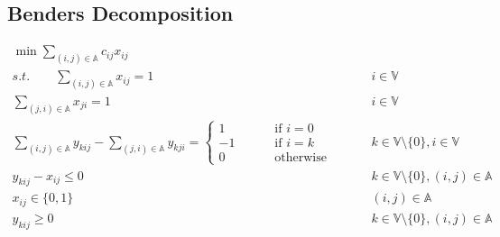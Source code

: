 \documentclass[UTF8]{article}
\begin{document}
	\subsection{Benders Decomposition}
		\begin{align*}
			\min \sum_{(i, j) \in \mathbb{A}} c_{ij} x_{ij} & \\
			s.t. \qquad \sum_{(i, j) \in \mathbb{A}} x_{ij} = 1 & \qquad i \in \mathbb{V} \\
			\sum_{(j, i) \in \mathbb{A}} x_{ji} = 1 & \qquad i \in \mathbb{V} \\
			\sum_{(i, j) \in \mathbb{A}} y_{kij} - \sum_{(j, i) \in \mathbb{A}} y_{kji} = 
				\left\{
					\begin{aligned}
						1 & \qquad \text{ if } i = 0 \\
						-1 & \qquad \text{ if } i = k \\
						0 & \qquad \text{ otherwise } 
					\end{aligned}
				\right. & \qquad k \in \mathbb{V} \setminus \{0\}, i \in \mathbb{V} \\
			y_{kij} - x_{ij} \le 0 & \qquad k \in \mathbb{V} \setminus \{0\}, (i, j) \in \mathbb{A} \\
			x_{ij} \in \{0, 1\} & \qquad (i, j) \in \mathbb{A} \\
			y_{kij} \ge 0 & \qquad k \in \mathbb{V} \setminus \{0\}, (i, j) \in \mathbb{A} 
		\end{align*}
\end{document}
